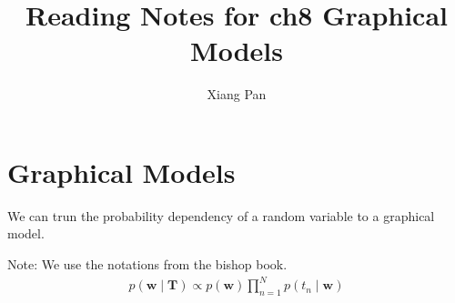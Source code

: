 \documentclass{article}
\title{Reading Notes for ch8 Graphical Models}
\author{Xiang Pan}
\begin{document}
\maketitle
\section{Graphical Models}
We can trun the probability dependency of a random variable to a graphical model.

Note: We use the notations from the bishop book.
\begin{align}
p(\mathbf{w} \mid \mathbf{T}) \propto p(\mathbf{w}) \prod_{n=1}^{N} p\left(t_{n} \mid \mathbf{w}\right)
\end{align}


        
\end{document}
